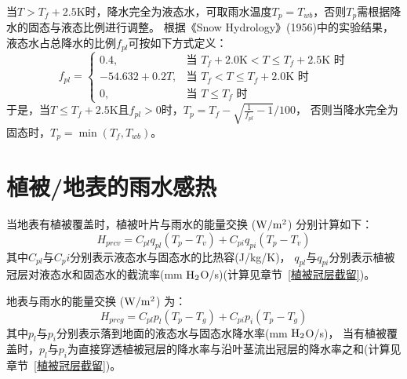 当$T>T_f+2.5$K时，降水完全为液态水，可取雨水温度$T_p=T_{wb}$，否则$T_p$需根据降水的固态与液态比例进行调整。
根据《Snow Hydrology》(1956)中的实验结果，液态水占总降水的比例$f_{pl}$可按如下方式定义：
\begin{equation*}
f_{pl}= \begin{cases}
0.4, & \text{当 } T_f+2.0\text{K}<T\le T_f+2.5\text{K} \text{ 时} \\
-54.632+0.2T, & \text{当 } T_f<T\le T_f+2.0\text{K} \text{ 时} \\
0, & \text{当 } T\le T_f \text{ 时}
\end{cases}
\end{equation*}
于是，当$T\le T_f+2.5\text{K}$且$f_{pl}>0$时，$T_p=T_f-\sqrt{\frac{1}{f_{pl}}-1}/100$，
否则当降水完全为固态时，$T_p=\min{\left(T_f,T_{wb}\right)}$。


\section{植被/地表的雨水感热}\label{植被地表的雨水感热}
当地表有植被覆盖时，植被叶片与雨水的能量交换 ($\rm W/m^2$) 分别计算如下：
\begin{equation}
H_{p r c v}=C_{p l} q_{p l}\left(T_{p}-T_{v}\right)+C_{p i} q_{p i}\left(T_{p}-T_{v}\right)
\end{equation}
%
其中$C_{pl}$与$C_pi$分别表示液态水与固态水的比热容(J/kg/K)，
$q_{pl}$与$q_{pi}$分别表示植被冠层对液态水和固态水的截流率(mm $\rm H_2$O/s)(计算见章节~\ref{植被冠层截留})。


地表与雨水的能量交换 ($\rm W/m^2$) 为：
\begin{equation}
H_{p r c g}=C_{p l} p_{l}\left(T_{p}-T_{g}\right)+C_{p i} p_{i}\left(T_{p}-T_{g}\right)
\end{equation}
其中$p_l$与$p_i$分别表示落到地面的液态水与固态水降水率(mm $\rm H_2$O/s)，
当有植被覆盖时，$p_l$与$p_i$为直接穿透植被冠层的降水率与沿叶茎流出冠层的降水率之和(计算见章节~\ref{植被冠层截留})。

